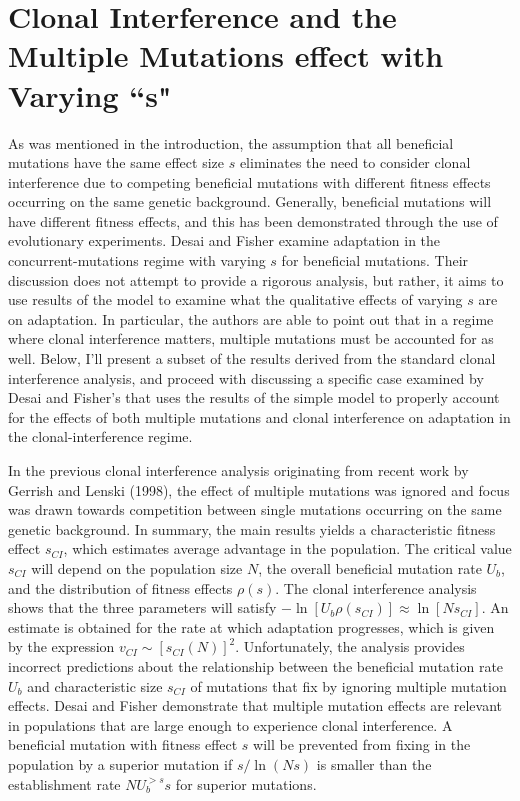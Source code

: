 \documentclass[12pt, one column]{article}
\begin{document}
\section*{Clonal Interference and the Multiple Mutations effect with Varying ``s"}
As was mentioned in the introduction, the assumption that all beneficial mutations have the same effect size $s$ eliminates the need to consider clonal interference due to competing beneficial mutations with different fitness effects occurring on the same genetic background.  Generally, beneficial mutations will have different fitness effects, and this has been demonstrated through the use of evolutionary experiments.  Desai and Fisher examine adaptation in the concurrent-mutations regime with varying $s$ for beneficial mutations.  Their discussion does not attempt to provide a rigorous analysis, but rather, it aims to use results of the model to examine what the qualitative effects of varying $s$ are on adaptation.  In particular, the authors are able to point out that in a regime where clonal interference matters, multiple mutations must be accounted for as well.  Below, I'll present a subset of the results derived from the standard clonal interference analysis, and proceed with discussing a specific case examined by Desai and Fisher's that uses the results of the simple model to properly account for the effects of both multiple mutations and clonal interference on adaptation in the clonal-interference regime.

In the previous clonal interference analysis originating from recent work by Gerrish and Lenski (1998), the effect of multiple mutations was ignored and focus was drawn towards competition between single mutations occurring on the same genetic background.  In summary, the main results yields a characteristic fitness effect $s_{CI}$, which estimates average advantage in the population.  The critical value $s_{CI}$ will depend on the population size $N$, the overall beneficial mutation rate $U_b$, and the distribution of fitness effects $\rho(s)$.  The clonal interference analysis shows that the three parameters will satisfy $-\ln[U_b \rho(s_{CI})] \approx \ln[N s_{CI}]$.  An estimate is obtained for the rate at which adaptation progresses, which is given by the expression $v_{CI} \sim [s_{CI}(N)]^2$.  Unfortunately, the analysis provides incorrect predictions about the relationship between the beneficial mutation rate $U_b$ and characteristic size $s_{CI}$ of mutations that fix by ignoring multiple mutation effects.  Desai and Fisher demonstrate that multiple mutation effects are relevant in populations that are large enough to experience clonal interference.  A beneficial mutation with fitness effect $s$ will be prevented from fixing in the population by a superior mutation if $s/\ln(Ns)$ is smaller than the establishment rate $NU_b^{>s}s$ for superior mutations.  
\end{document}
